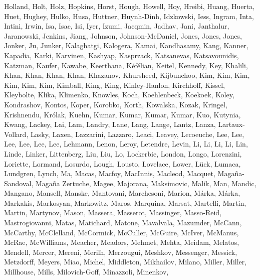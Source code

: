 \documentclass[times,tight]{aastex631}
\begin{document}
\begin{thebibliography}{}
{  {Holland}, {Holt}, {Holz}, {Hopkins}, {Horst}, {Hough}, {Howell}, {Hoy},
  {Hreibi}, {Huang}, {Huerta}, {Huet}, {Hughey}, {Hulko}, {Husa}, {Huttner},
  {Huynh-Dinh}, {Idzkowski}, {Iess}, {Ingram}, {Inta}, {Intini}, {Irwin},
  {Isa}, {Isac}, {Isi}, {Iyer}, {Izumi}, {Jacqmin}, {Jadhav}, {Jani},
  {Janthalur}, {Jaranowski}, {Jenkins}, {Jiang}, {Johnson}, {Johnson-McDaniel},
  {Jones}, {Jones}, {Jones}, {Jonker}, {Ju}, {Junker}, {Kalaghatgi},
  {Kalogera}, {Kamai}, {Kandhasamy}, {Kang}, {Kanner}, {Kapadia}, {Karki},
  {Karvinen}, {Kashyap}, {Kasprzack}, {Katsanevas}, {Katsavounidis}, {Katzman},
  {Kaufer}, {Kawabe}, {Keerthana}, {K{\'e}f{\'e}lian}, {Keitel}, {Kennedy},
  {Key}, {Khalili}, {Khan}, {Khan}, {Khan}, {Khan}, {Khazanov}, {Khursheed},
  {Kijbunchoo}, {Kim}, {Kim}, {Kim}, {Kim}, {Kim}, {Kim}, {Kimball}, {King},
  {King}, {Kinley-Hanlon}, {Kirchhoff}, {Kissel}, {Kleybolte}, {Klika},
  {Klimenko}, {Knowles}, {Koch}, {Koehlenbeck}, {Koekoek}, {Koley},
  {Kondrashov}, {Kontos}, {Koper}, {Korobko}, {Korth}, {Kowalska}, {Kozak},
  {Kringel}, {Krishnendu}, {Kr{\'o}lak}, {Kuehn}, {Kumar}, {Kumar}, {Kumar},
  {Kumar}, {Kuo}, {Kutynia}, {Kwang}, {Lackey}, {Lai}, {Lam}, {Landry}, {Lane},
  {Lang}, {Lange}, {Lantz}, {Lanza}, {Lartaux-Vollard}, {Lasky}, {Laxen},
  {Lazzarini}, {Lazzaro}, {Leaci}, {Leavey}, {Lecoeuche}, {Lee}, {Lee}, {Lee},
  {Lee}, {Lee}, {Lee}, {Lehmann}, {Lenon}, {Leroy}, {Letendre}, {Levin}, {Li},
  {Li}, {Li}, {Li}, {Lin}, {Linde}, {Linker}, {Littenberg}, {Liu}, {Liu}, {Lo},
  {Lockerbie}, {London}, {Longo}, {Lorenzini}, {Loriette}, {Lormand},
  {Losurdo}, {Lough}, {Lousto}, {Lovelace}, {Lower}, {L{\"u}ck}, {Lumaca},
  {Lundgren}, {Lynch}, {Ma}, {Macas}, {Macfoy}, {MacInnis}, {Macleod},
  {Macquet}, {Maga{\~n}a-Sandoval}, {Maga{\~n}a Zertuche}, {Magee}, {Majorana},
  {Maksimovic}, {Malik}, {Man}, {Mandic}, {Mangano}, {Mansell}, {Manske},
  {Mantovani}, {Marchesoni}, {Marion}, {M{\'a}rka}, {M{\'a}rka}, {Markakis},
  {Markosyan}, {Markowitz}, {Maros}, {Marquina}, {Marsat}, {Martelli},
  {Martin}, {Martin}, {Martynov}, {Mason}, {Massera}, {Masserot}, {Massinger},
  {Masso-Reid}, {Mastrogiovanni}, {Matas}, {Matichard}, {Matone}, {Mavalvala},
  {Mazumder}, {McCann}, {McCarthy}, {McClelland}, {McCormick}, {McCuller},
  {McGuire}, {McIver}, {McManus}, {McRae}, {McWilliams}, {Meacher}, {Meadors},
  {Mehmet}, {Mehta}, {Meidam}, {Melatos}, {Mendell}, {Mercer}, {Mereni},
  {Merilh}, {Merzougui}, {Meshkov}, {Messenger}, {Messick}, {Metzdorff},
  {Meyers}, {Miao}, {Michel}, {Middleton}, {Mikhailov}, {Milano}, {Miller},
  {Miller}, {Millhouse}, {Mills}, {Milovich-Goff}, {Minazzoli}, {Minenkov},
}
\end{thebibliography}
\end{document}
